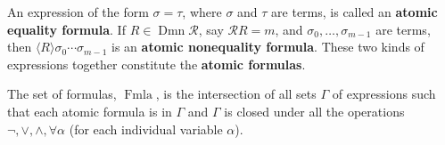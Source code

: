 An expression of the form $\sigma = \tau$, where $\sigma$ and $\tau$ are terms, is called an \textbf{atomic equality formula}. If $R \in \operatorname{Dmn} \mathcal{R}$, say $\mathcal{R}R = m$, and $\sigma_0, \ldots, \sigma_{m-1}$ are terms, then $\langle R \rangle \sigma_0 \cdots \sigma_{m-1}$ is an \textbf{atomic nonequality formula}. These two kinds of expressions together constitute the \textbf{atomic formulas}.

The set of formulas, $\operatorname{Fmla}$, is the intersection of all sets $\Gamma$ of expressions such that each atomic formula is in $\Gamma$ and $\Gamma$ is closed under all the operations $\neg, \vee, \wedge, \forall \alpha$ (for each individual variable $\alpha$).
